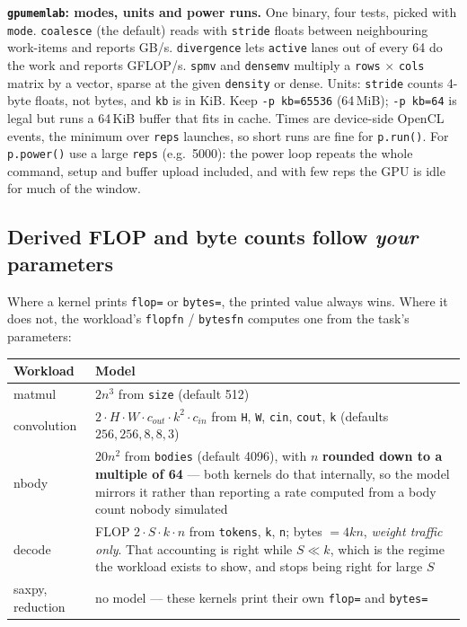 \documentclass[11pt,a4paper]{article}
\newcommand{\code}[1]{\texttt{\let\_\breakableunderscore #1}}
\newcommand{\breakableunderscore}{\textunderscore\allowbreak}
\begin{document}
\noindent \textbf{\code{gpu\_memlab}: modes, units and power runs.} One binary,
four tests, picked with \code{mode}. \code{coalesce} (the default) reads with
\code{stride} floats between neighbouring work-items and reports GB/s.
\code{divergence} lets \code{active} lanes out of every 64 do the work and
reports GFLOP/s. \code{spmv} and \code{densemv} multiply a \code{rows} $\times$
\code{cols} matrix by a vector, sparse at the given \code{density} or dense.
Units: \code{stride} counts 4-byte floats, not bytes, and \code{kb} is in KiB.
Keep \code{-p kb=65536} (64\,MiB); \code{-p kb=64} is legal but runs a 64\,KiB
buffer that fits in cache. Times are device-side OpenCL events, the minimum over
\code{reps} launches, so short runs are fine for \code{p.run()}. For
\code{p.power()} use a large \code{reps} (e.g.\ 5000): the power loop repeats the
whole command, setup and buffer upload included, and with few reps the GPU is
idle for much of the window.

\subsection{Derived FLOP and byte counts follow \emph{your} parameters}

Where a kernel prints \code{flop=} or \code{bytes=}, the printed value always
wins. Where it does not, the workload's \code{flop\_fn} / \code{bytes\_fn}
computes one from the task's parameters:

\begin{longtable}{@{}p{2.1cm}p{12.6cm}@{}}
\toprule
\textbf{Workload} & \textbf{Model} \\
\midrule
\endhead
matmul & $2n^3$ from \code{size} (default 512) \\
convolution & $2 \cdot H \cdot W \cdot c_{out} \cdot k^2 \cdot c_{in}$ from
  \code{H}, \code{W}, \code{cin}, \code{cout}, \code{k} (defaults
  $256, 256, 8, 8, 3$) \\
nbody & $20 n^2$ from \code{bodies} (default 4096), with $n$ \textbf{rounded
  down to a multiple of 64} --- both kernels do that internally, so the model
  mirrors it rather than reporting a rate computed from a body count nobody
  simulated \\
decode & FLOP $2 \cdot S \cdot k \cdot n$ from \code{tokens}, \code{k},
  \code{n}; bytes $= 4kn$, \emph{weight traffic only}. That accounting is right
  while $S \ll k$, which is the regime the workload exists to show, and stops
  being right for large $S$ \\
saxpy, reduction & no model --- these kernels print their own \code{flop=} and
  \code{bytes=} \\
\bottomrule
\end{longtable}
\end{document}
